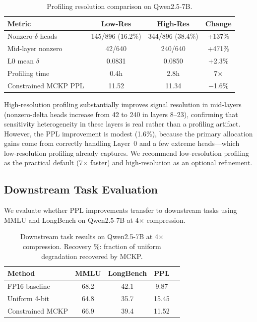 \documentclass[11pt,a4paper]{article}
\begin{document}
\begin{table}[t]
\centering
\small
\caption{Profiling resolution comparison on Qwen2.5-7B.}
\label{tab:hires}
\begin{tabular}{lccc}
\toprule
\textbf{Metric} & \textbf{Low-Res} & \textbf{High-Res} & \textbf{Change} \\
\midrule
Nonzero-$\delta$ heads & 145/896 (16.2\%) & 344/896 (38.4\%) & +137\% \\
Mid-layer nonzero      & 42/640            & 240/640           & +471\% \\
L0 mean $\delta$       & 0.0831            & 0.0850            & +2.3\% \\
Profiling time         & 0.4h              & 2.8h              & 7$\times$ \\
Constrained MCKP PPL   & 11.52             & 11.34             & $-$1.6\% \\
\bottomrule
\end{tabular}
\end{table}

High-resolution profiling substantially improves signal resolution in mid-layers (nonzero-delta heads increase from 42 to 240 in layers 8--23), confirming that sensitivity heterogeneity in these layers is real rather than a profiling artifact.
However, the PPL improvement is modest (1.6\%), because the primary allocation gains come from correctly handling Layer~0 and a few extreme heads---which low-resolution profiling already captures.
We recommend low-resolution profiling as the practical default (7$\times$ faster) and high-resolution as an optional refinement.

\subsection{Downstream Task Evaluation}
\label{sec:downstream}

We evaluate whether PPL improvements transfer to downstream tasks using MMLU and LongBench on Qwen2.5-7B at 4$\times$ compression.

\begin{table}[t]
\centering
\small
\caption{Downstream task results on Qwen2.5-7B at 4$\times$ compression. Recovery \%: fraction of uniform degradation recovered by MCKP.}
\label{tab:downstream}
\begin{tabular}{lcccc}
\toprule
\textbf{Method} & \textbf{MMLU} & \textbf{LongBench} & \textbf{PPL} \\
\midrule
FP16 baseline     & 68.2 & 42.1 &  9.87 \\
Uniform 4-bit     & 64.8 & 35.7 & 15.45 \\
Constrained MCKP  & 66.9 & 39.4 & 11.52 \\
\bottomrule
\end{tabular}
\end{table}
\end{document}
